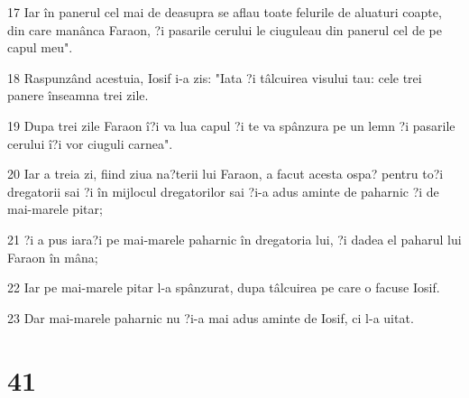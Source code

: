 \par 17 Iar în panerul cel mai de deasupra se aflau toate felurile de aluaturi coapte, din care manânca Faraon, ?i pasarile cerului le ciuguleau din panerul cel de pe capul meu".
\par 18 Raspunzând acestuia, Iosif i-a zis: "Iata ?i tâlcuirea visului tau: cele trei panere înseamna trei zile.
\par 19 Dupa trei zile Faraon î?i va lua capul ?i te va spânzura pe un lemn ?i pasarile cerului î?i vor ciuguli carnea".
\par 20 Iar a treia zi, fiind ziua na?terii lui Faraon, a facut acesta ospa? pentru to?i dregatorii sai ?i în mijlocul dregatorilor sai ?i-a adus aminte de paharnic ?i de mai-marele pitar;
\par 21 ?i a pus iara?i pe mai-marele paharnic în dregatoria lui, ?i dadea el paharul lui Faraon în mâna;
\par 22 Iar pe mai-marele pitar l-a spânzurat, dupa tâlcuirea pe care o facuse Iosif.
\par 23 Dar mai-marele paharnic nu ?i-a mai adus aminte de Iosif, ci l-a uitat.

\chapter{41}

